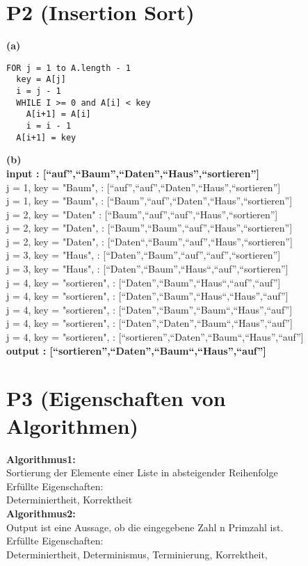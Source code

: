 \documentclass[a4paper,12pt]{article}
\begin{document}
\section{P2 (Insertion Sort)}
\textbf{(a)} \\
\begin{lstlisting}
FOR j = 1 to A.length - 1
  key = A[j]
  i = j - 1
  WHILE I >= 0 and A[i] < key
    A[i+1] = A[i]
    i = i - 1
  A[i+1] = key
\end{lstlisting}
\vspace*{1\baselineskip}
\textbf{(b)} \\
\textbf{input : [“auf”,“Baum”,“Daten”,“Haus”,“sortieren”]}\\
j = 1, key = "Baum", : [“auf”,“auf”,“Daten”,“Haus”,“sortieren”]\\
j = 1, key = "Baum", : [“Baum”,“auf”,“Daten”,“Haus”,“sortieren”]\\
j = 2, key = "Daten" : [“Baum”,“auf”,“auf”,“Haus”,“sortieren”]\\
j = 2, key = "Daten", : [“Baum”,“Baum”,“auf”,“Haus”,“sortieren”]\\
j = 2, key = "Daten", : [“Daten“,“Baum”,“auf”,“Haus”,“sortieren”]\\
j = 3, key = "Haus", : [“Daten”,“Baum”,“auf”,“auf”,“sortieren”]\\
j = 3, key = "Haus", : [“Daten”,“Baum”,“Haus“,“auf”,“sortieren”]\\
j = 4, key = "sortieren", : [“Daten”,“Baum”,“Haus“,“auf”,“auf”]\\
j = 4, key = "sortieren", : [“Daten”,“Baum”,“Haus“,“Haus”,“auf”]\\
j = 4, key = "sortieren", : [“Daten”,“Baum”,“Baum“,“Haus”,“auf”]\\
j = 4, key = "sortieren", : [“Daten”,“Daten”,“Baum“,“Haus”,“auf”]\\
j = 4, key = "sortieren", : [“sortieren”,“Daten”,“Baum“,“Haus”,“auf”]\\
\textbf{output : [“sortieren”,“Daten”,“Baum“,“Haus”,“auf”]}

\section{P3 (Eigenschaften von Algorithmen)}
\textbf{Algorithmus1:} \\
Sortierung der Elemente einer Liste in absteigender Reihenfolge \\
Erfüllte Eigenschaften: \\
Determiniertheit,  Korrektheit\\
\textbf{Algorithmus2:} \\
Output ist eine Aussage, ob die eingegebene Zahl n Primzahl ist. \\
Erfüllte Eigenschaften: \\
Determiniertheit, Determinismus, Terminierung, Korrektheit,
\end{document}
